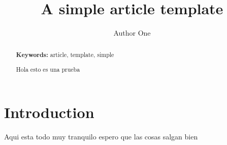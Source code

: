 \documentclass[a4paper]{article}
\title{A simple article template}
\author{Author One}
\begin{document}
\maketitle
	
\begin{abstract}

		
\noindent \textbf{Keywords:} article, template, simple

Hola esto es una prueba

\end{abstract}

\section{Introduction}

Aqui esta todo muy tranquilo espero que las cosas salgan bien
\end{document}
